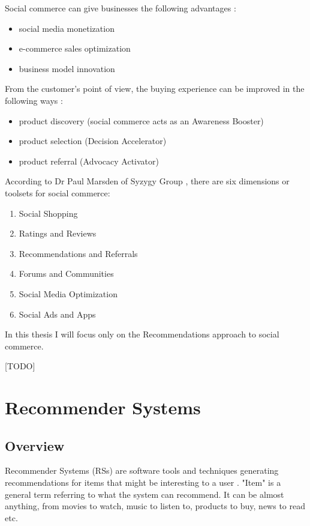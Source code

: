 \documentclass[12pt]{report}
\begin{document}

Social commerce can give businesses the following advantages \cite{social_commerce_syzygy}:
\begin{itemize}
\item social media monetization
\item e-commerce sales optimization
\item business model innovation
\end{itemize}

From the customer's point of view, the buying experience can be improved in the following ways \cite{social_commerce_syzygy}:
\begin{itemize}
\item product discovery (social commerce acts as an Awareness Booster)
\item product selection (Decision Accelerator)
\item product referral (Advocacy Activator)
\end{itemize}

According to Dr Paul Marsden of Syzygy Group \cite{social_commerce_syzygy}, there are six dimensions or toolsets for social commerce:
\begin{enumerate}
\item Social Shopping
\item Ratings and Reviews
\item Recommendations and Referrals
\item Forums and Communities
\item Social Media Optimization
\item Social Ads and Apps
\end{enumerate}

In this thesis I will focus only on the Recommendations approach to social commerce.

[TODO]

\section{Recommender Systems}

\subsection{Overview}

Recommender Systems (RSs) are software tools and techniques generating recommendations for items that might be interesting to a user \cite{rec_sys_handbook}. "Item" is a general term referring to what the system can recommend. It can be almost anything, from movies to watch, music to listen to, products to buy, news to read etc.
\end{document}
